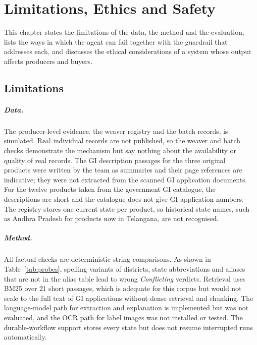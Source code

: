 \chapter{Limitations, Ethics and Safety}

This chapter states the limitations of the data, the method and the evaluation, lists the ways in
which the agent can fail together with the guardrail that addresses each, and discusses the ethical
considerations of a system whose output affects producers and buyers.

\section{Limitations}

\paragraph{Data.} The producer-level evidence, the weaver registry and the batch records, is simulated.
Real individual records are not published, so the weaver and batch checks demonstrate the mechanism
but say nothing about the availability or quality of real records. The GI description passages for the
three original products were written by the team as summaries and their page references are
indicative; they were not extracted from the scanned GI application documents. For the twelve products
taken from the government GI catalogue, the descriptions are short and the catalogue does not give GI
application numbers. The registry stores one current state per product, so historical state names, such
as Andhra Pradesh for products now in Telangana, are not recognised.

\paragraph{Method.} All factual checks are deterministic string comparisons. As shown in
Table~\ref{tab:probes}, spelling variants of districts, state abbreviations and aliases that are not in
the alias table lead to wrong \emph{Conflicting} verdicts. Retrieval uses BM25 over 21 short passages,
which is adequate for this corpus but would not scale to the full text of GI applications without dense
retrieval and chunking. The language-model path for extraction and explanation is implemented but was
not evaluated, and the OCR path for label images was not installed or tested. The durable-workflow
support stores every state but does not resume interrupted runs automatically.

